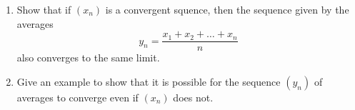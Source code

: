\documentclass[12pt]{article}
\newenvironment{problem}[2][Problem]{\begin{trivlist} \item[\hskip \labelsep {\bfseries #1}\hskip \labelsep {\bfseries #2.}]}{\end{trivlist}}
\begin{document}
    \begin{problem}{2.3.11 (Cesaro Means)}
    \begin{enumerate}
      \item Show that if $(x_{n})$ is a convergent squence, then the sequence given by the averages
    \begin{equation*}
      y_{n} = \frac{x_{1}+x_{2}+\dots+x_{n}}{n}
    \end{equation*}
    also converges to the same limit.
  \item Give an example to show that it is possible for the sequence $(y_{n})$ of averages to converge even if $(x_{n})$ does not.
    \end{enumerate}
    \end{problem}
\end{document}
